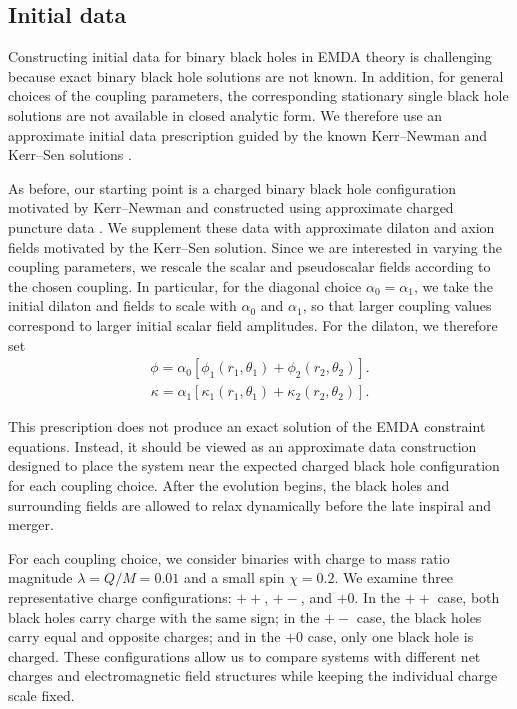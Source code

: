 \subsection{Initial data}

Constructing initial data for binary black holes in EMDA theory is challenging because exact binary black hole solutions are not known. In addition, for general choices of the coupling parameters, the corresponding stationary single black hole solutions are not available in closed analytic form. We therefore use an approximate initial data prescription guided by the known Kerr--Newman and Kerr--Sen solutions \cite{Sen1992,Sen1995}.

As before, our starting point is a charged binary black hole configuration motivated by Kerr--Newman and constructed using approximate charged puncture data \cite{Bowen1980,Alcubierre2009,Bozzola2019}. We supplement these data with approximate dilaton and axion fields motivated by the Kerr--Sen solution. Since we are interested in varying the coupling parameters, we rescale the scalar and pseudoscalar fields according to the chosen coupling. In particular, for the diagonal choice $\alpha_0=\alpha_1$, we take the initial dilaton and fields to scale with $\alpha_0$ and $\alpha_1$, so that larger coupling values correspond to larger initial scalar field amplitudes. For the dilaton, we therefore set
\begin{align}
    \phi = \alpha_0 \left[\phi_1(r_1,\theta_1) + \phi_2(r_2,\theta_2)\right].
\end{align}
\begin{align}
    \kappa = \alpha_1 \left[\kappa_1(r_1,\theta_1) + \kappa_2(r_2,\theta_2)\right].
\end{align}

This prescription does not produce an exact solution of the EMDA constraint equations. Instead, it should be viewed as an approximate data construction designed to place the system near the expected charged black hole configuration for each coupling choice. After the evolution begins, the black holes and surrounding fields are allowed to relax dynamically before the late inspiral and merger.

For each coupling choice, we consider binaries with charge to mass ratio magnitude $\lambda=Q/M=0.01$ and a small spin $\chi=0.2$. We examine three representative charge configurations: $++$, $+-$, and $+0$. In the $++$ case, both black holes carry charge with the same sign; in the $+-$ case, the black holes carry equal and opposite charges; and in the $+0$ case, only one black hole is charged. These configurations allow us to compare systems with different net charges and electromagnetic field structures while keeping the individual charge scale fixed.


